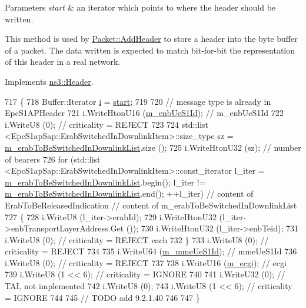 \begin{DoxyParams}{Parameters}
{\em start} & an iterator which points to where the header should be written.\\
\hline
\end{DoxyParams}
This method is used by \hyperlink{classns3_1_1Packet_a465108c595a0bc592095cbcab1832ed8}{Packet\+::\+Add\+Header} to store a header into the byte buffer of a packet. The data written is expected to match bit-\/for-\/bit the representation of this header in a real network. 

Implements \hyperlink{classns3_1_1Header_afb61f1aac69ff8349a6bfe521fab5404}{ns3\+::\+Header}.


\begin{DoxyCode}
717 \{
718   Buffer::Iterator \hyperlink{bernuolliDistribution_8m_a6f6ccfcf58b31cb6412107d9d5281426}{i} = \hyperlink{namespacevisualizer_1_1core_a2a35e5d8a34af358b508dac8635754e0}{start};
719 
720   \textcolor{comment}{// message type is already in EpcS1APHeader }
721   i.WriteHtonU16 (\hyperlink{classns3_1_1EpcS1APPathSwitchRequestHeader_ac577234e0c15c7c1f689994d1faec01c}{m\_enbUeS1Id});     \textcolor{comment}{// m\_enbUeS1Id}
722   i.WriteU8 (0);               \textcolor{comment}{// criticality = REJECT}
723 
724   std::list <EpcS1apSap::ErabSwitchedInDownlinkItem>::size\_type sz = 
      \hyperlink{classns3_1_1EpcS1APPathSwitchRequestHeader_af9e55298c3f2926e5bc3146b4e5b212f}{m\_erabToBeSwitchedInDownlinkList}.size (); 
725   i.WriteHtonU32 (sz);              \textcolor{comment}{// number of bearers}
726   \textcolor{keywordflow}{for} (std::list <EpcS1apSap::ErabSwitchedInDownlinkItem>::const\_iterator l\_iter = 
      \hyperlink{classns3_1_1EpcS1APPathSwitchRequestHeader_af9e55298c3f2926e5bc3146b4e5b212f}{m\_erabToBeSwitchedInDownlinkList}.begin(); l\_iter != 
      \hyperlink{classns3_1_1EpcS1APPathSwitchRequestHeader_af9e55298c3f2926e5bc3146b4e5b212f}{m\_erabToBeSwitchedInDownlinkList}.end(); ++l\_iter) \textcolor{comment}{// content of
       ErabToBeReleasedIndication // content of m\_erabToBeSwitchedInDownlinkList}
727   \{
728     i.WriteU8 (l\_iter->erabId);
729     i.WriteHtonU32 (l\_iter->enbTransportLayerAddress.Get ());
730     i.WriteHtonU32 (l\_iter->enbTeid);
731     i.WriteU8 (0);               \textcolor{comment}{// criticality = REJECT each}
732   \}
733   i.WriteU8 (0);               \textcolor{comment}{// criticality = REJECT}
734 
735   i.WriteU64 (\hyperlink{classns3_1_1EpcS1APPathSwitchRequestHeader_a1ba924af488ee3ae3afaf42632681048}{m\_mmeUeS1Id});         \textcolor{comment}{// mmeUeS1Id}
736   i.WriteU8 (0);               \textcolor{comment}{// criticality = REJECT}
737 
738   i.WriteU16 (\hyperlink{classns3_1_1EpcS1APPathSwitchRequestHeader_a66d50af4977820fe04dd976818011885}{m\_ecgi});      \textcolor{comment}{// ecgi}
739   i.WriteU8 (1 << 6);       \textcolor{comment}{// criticality = IGNORE}
740 
741   i.WriteU32 (0);                   \textcolor{comment}{// TAI, not implemented}
742   i.WriteU8 (0);
743   i.WriteU8 (1 << 6);               \textcolor{comment}{// criticality = IGNORE}
744 
745   \textcolor{comment}{// TODO add 9.2.1.40}
746 
747 \}
\end{DoxyCode}


